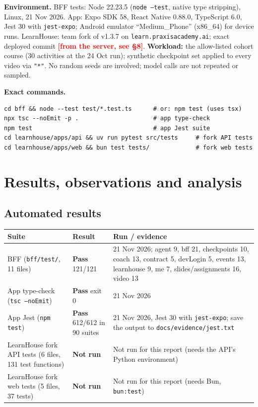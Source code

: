 \documentclass[11pt,a4paper]{article}
\newcommand{\pass}{\textcolor{okgreen}{\textbf{Pass}}}
\newcommand{\notrun}{\textcolor{notdone}{\textbf{Not run}}}
\newcommand{\fillin}[1]{\textcolor{red}{\textbf{[#1]}}}
\newcommand{\fp}[1]{\nolinkurl{#1}}
\begin{document}
\textbf{Environment.} BFF tests: Node 22.23.5 (\texttt{node --test}, native type stripping), Linux,
21 Nov 2026. App: Expo SDK 58, React Native 0.88.0, TypeScript 6.0, Jest 30 with \texttt{jest-expo};
Android emulator ``Medium\_Phone'' (x86\_64) for device runs. LearnHouse: team fork of v1.3.7 on
\texttt{learn.praxisacademy.ai}; exact deployed commit \fillin{from the server, see §8}.
\textbf{Workload:} the allow-listed cohort course (30 activities at the 24 Oct run); synthetic
checkpoint set applied to every video via \texttt{"*"}. No random seeds are involved; model calls are
not repeated or sampled.

\textbf{Exact commands.}
\begin{verbatim}
cd bff && node --test test/*.test.ts      # or: npm test (uses tsx)
npx tsc --noEmit -p .                     # app type-check
npm test                                  # app Jest suite
cd learnhouse/apps/api && uv run pytest src/tests     # fork API tests
cd learnhouse/apps/web && bun test tests/             # fork web tests
\end{verbatim}

\section{Results, observations and analysis}

\subsection{Automated results}
\begin{xltabular}{\textwidth}{L{0.32\textwidth}L{0.2\textwidth}Y}
\toprule
\textbf{Suite} & \textbf{Result} & \textbf{Run / evidence} \\
\midrule
BFF (\fp{bff/test/}, 11 files) & \pass{} 121/121 & 21 Nov 2026; agent 9, bff 21, checkpoints 10, coach 13, contract 5, devLogin 5, events 13, learnhouse 9, me 7, slides/assignments 16, video 13 \\
App type-check (\texttt{tsc --noEmit}) & \pass{} exit 0 & 21 Nov 2026 \\
App Jest (\texttt{npm test}) & \pass{} 612/612 in 90 suites & 21 Nov 2026, Jest 30 with \texttt{jest-expo}; save the output to \fp{docs/evidence/jest.txt} \\
LearnHouse fork API tests (6 files, 131 test functions) & \notrun & Not run for this report (needs the API's Python environment) \\
LearnHouse fork web tests (5 files, 37 tests) & \notrun & Not run for this report (needs Bun, \texttt{bun:test}) \\
\bottomrule
\end{xltabular}
\end{document}
